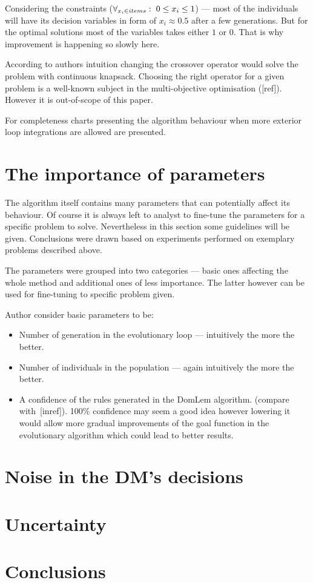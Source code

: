 Considering the constraints ($ \forall_{x_i \in items}: \hspace{0.1cm} 0 \leq
x_i \leq 1 $) --- most of the individuals will have its decision variables in
form of $x_i \approx 0.5$ after a few generations. But for the optimal
solutions most of the variables takes either $1$ or $0$. That is why
improvement is happening so slowly here.

According to authors intuition changing the crossover operator would solve the
problem with continuous knapsack. Choosing the right operator for a given
problem is a well-known subject in the multi-objective optimisation
([ref]). However it is out-of-scope of this paper.

For completeness charts presenting the algorithm behaviour when more exterior
loop integrations are allowed are presented.






\clearpage{}
\section{The importance of parameters}

The algorithm itself contains many parameters that can potentially affect its
behaviour. Of course it is always left to analyst to fine-tune the parameters
for a specific problem to solve. Nevertheless in this section some guidelines
will be given. Conclusions were drawn based on experiments performed on
exemplary problems described above.

The parameters were grouped into two categories --- basic ones affecting the
whole method and additional ones of less importance. The latter however can be
used for fine-tuning to specific problem given.

Author consider basic parameters to be:
\begin{itemize}
\item Number of generation in the evolutionary loop --- intuitively the more
  the better.
\item Number of individuals in the population --- again intuitively the more
  the better.
\item A confidence of the rules generated in the DomLem algorithm. (compare
  with~[inref]). 100\% confidence may seem a good idea however lowering it
  would allow more gradual improvements of the goal function in the
  evolutionary algorithm which could lead to better results.
\end{itemize}



\clearpage{}
\section{Noise in the DM's decisions}

\section{Uncertainty}

\section{Conclusions}

